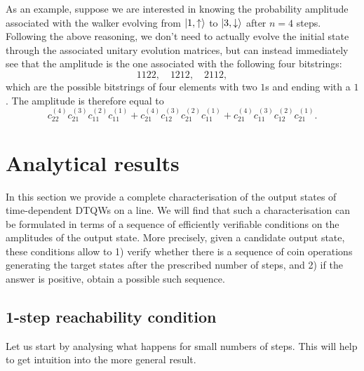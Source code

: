 \begin{example}[label={ex:qw_bimatrix_notation}]
    As an example, suppose we are interested in knowing the probability amplitude associated with the walker evolving from $\ket{1,\uparrow}$ to $\ket{3,\downarrow}$ after $n=4$ steps. Following the above reasoning, we don't need to actually evolve the initial state through the associated unitary evolution matrices, but can instead immediately see that the amplitude is the one associated with the following four bitstrings:
    \begin{equation}
        1122, \quad 1212, \quad 2112,
    \end{equation}
    which are the possible bitstrings of four elements with two $1$s and ending with a $1$. The amplitude is therefore equal to
    \begin{equation}
        c^{(4)}_{22} c^{(3)}_{21} c^{(2)}_{11} c^{(1)}_{11} +
        c^{(4)}_{21} c^{(3)}_{12} c^{(2)}_{21} c^{(1)}_{11} +
        c^{(4)}_{21} c^{(3)}_{11} c^{(2)}_{12} c^{(1)}_{21}.
    \end{equation}
\end{example}


\section{Analytical results}
\label{sec:qw_reachability_conditions}

In this section we provide a complete characterisation of the output states of time-dependent \acp{DTQW} on a line.
We will find that such a characterisation can be formulated in terms of a sequence of efficiently verifiable conditions on the amplitudes of the output state.
More precisely, given a candidate output state, these conditions allow to 1) verify whether there is a sequence of coin operations generating the target states after the prescribed number of steps, and 2) if the answer is positive, obtain a possible such sequence.

\subsection{1-step reachability condition}
\label{sec:qw_1step_reachability}

Let us start by analysing what happens for small numbers of steps. This will help to get intuition into the more general result.

